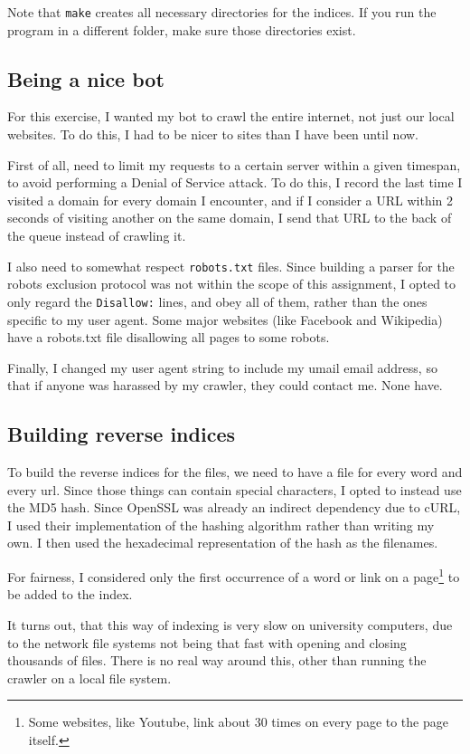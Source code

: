 \documentclass[12pt,a4paper]{article}
\begin{document}
Note that \texttt{make} creates all necessary directories for the indices. If you run the program in a different folder, make sure those directories exist.

\subsection{Being a nice bot}

For this exercise, I wanted my bot to crawl the entire internet, not just our local websites. To do this, I had to be nicer to sites than I have been until now.

First of all, need to limit my requests to a certain server within a given timespan, to avoid performing a Denial of Service attack. To do this, I record the last time I visited a domain for every domain I encounter, and if I consider a URL within 2 seconds of visiting another on the same domain, I send that URL to the back of the queue instead of crawling it.

I also need to somewhat respect \texttt{robots.txt} files. Since building a parser for the robots exclusion protocol was not within the scope of this assignment, I opted to only regard the \texttt{Disallow:} lines, and obey all of them, rather than the ones specific to my user agent. Some major websites (like Facebook and Wikipedia) have a robots.txt file disallowing all pages to some robots.

Finally, I changed my user agent string to include my umail email address, so that if anyone was harassed by my crawler, they could contact me. None have.

\subsection{Building reverse indices}

To build the reverse indices for the files, we need to have a file for every word and every url. Since those things can contain special characters, I opted to instead use the MD5 hash. Since OpenSSL was already an indirect dependency due to cURL, I used their implementation of the hashing algorithm rather than writing my own. I then used the hexadecimal representation of the hash as the filenames.

For fairness, I considered only the first occurrence of a word or link on a page\footnote{Some websites, like Youtube, link about 30 times on every page to the page itself.} to be added to the index.

It turns out, that this way of indexing is very slow on university computers, due to the network file systems not being that fast with opening and closing thousands of files. There is no real way around this, other than running the crawler on a local file system.
\end{document}
